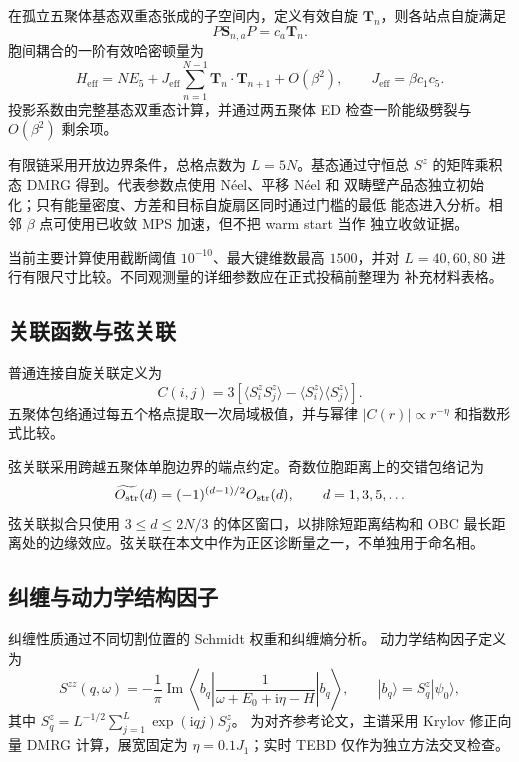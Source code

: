 在孤立五聚体基态双重态张成的子空间内，定义有效自旋
$\bm T_n$，则各站点自旋满足
\begin{equation}
P\bm S_{n,a}P=c_a\bm T_n.
\end{equation}
胞间耦合的一阶有效哈密顿量为
\begin{equation}
H_{\mathrm{eff}}=NE_5+J_{\mathrm{eff}}
\sum_{n=1}^{N-1}\bm T_n\cdot\bm T_{n+1}+O(\beta^2),
\qquad J_{\mathrm{eff}}=\beta c_1c_5.
\label{eq:effective-chain}
\end{equation}
投影系数由完整基态双重态计算，并通过两五聚体 ED 检查一阶能级劈裂与
$O(\beta^2)$ 剩余项。

有限链采用开放边界条件，总格点数为 $L=5N$。基态通过守恒总
$S^z$ 的矩阵乘积态 DMRG 得到。代表参数点使用 N\'{e}el、平移 N\'{e}el 和
双畴壁产品态独立初始化；只有能量密度、方差和目标自旋扇区同时通过门槛的最低
能态进入分析。相邻 $\beta$ 点可使用已收敛 MPS 加速，但不把 warm start 当作
独立收敛证据。

当前主要计算使用截断阈值 $10^{-10}$、最大键维数最高 $1500$，并对
$L=40,60,80$ 进行有限尺寸比较。不同观测量的详细参数应在正式投稿前整理为
补充材料表格。

\subsection{关联函数与弦关联}

普通连接自旋关联定义为
\begin{equation}
C(i,j)=
3\left[
\langle S_i^zS_j^z\rangle
-\langle S_i^z\rangle\langle S_j^z\rangle
\right].
\end{equation}
五聚体包络通过每五个格点提取一次局域极值，并与幂律
$|C(r)|\propto r^{-\eta}$ 和指数形式比较。

弦关联采用跨越五聚体单胞边界的端点约定。奇数位胞距离上的交错包络记为
\begin{equation}
\widetilde{O_{\mathrm{str}}}(d)=
(-1)^{(d-1)/2}O_{\mathrm{str}}(d),
\qquad d=1,3,5,\ldots
\end{equation}
弦关联拟合只使用 $3\le d\le 2N/3$ 的体区窗口，以排除短距离结构和
OBC 最长距离处的边缘效应。弦关联在本文中作为正区诊断量之一，不单独用于命名相。

\subsection{纠缠与动力学结构因子}

纠缠性质通过不同切割位置的 Schmidt 权重和纠缠熵分析。
动力学结构因子定义为
\begin{equation}
S^{zz}(q,\omega)=-\frac{1}{\pi}\operatorname{Im}
\left\langle b_q\left|
\frac{1}{\omega+E_0+\mathrm{i}\eta-H}
\right|b_q\right\rangle,
\qquad
|b_q\rangle=S_q^z|\psi_0\rangle,
\end{equation}
其中
$S_q^z=L^{-1/2}\sum_{j=1}^{L}\exp(\mathrm{i}qj)S_j^z$。
为对齐参考论文，主谱采用 Krylov 修正向量 DMRG 计算，展宽固定为
$\eta=0.1J_1$；实时 TEBD 仅作为独立方法交叉检查。

